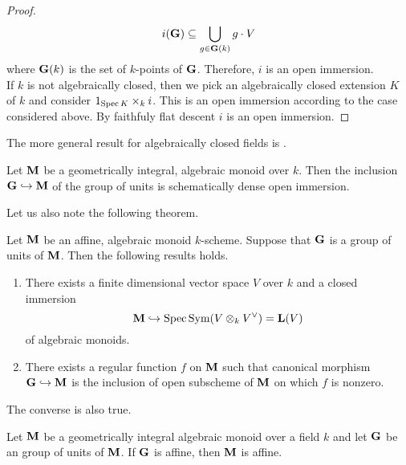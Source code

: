 \begin{proof}
$$i(\mathbf{G})\subseteq \bigcup_{g\in \mathbf{G}(k)}g\cdot V$$
where $\mathbf{G}(k)$ is the set of $k$-points of $\mathbf{G}$. Therefore, $i$ is an open immersion.\\
If $k$ is not algebraically closed, then we pick an algebraically closed extension $K$ of $k$ and consider $1_{\mathrm{Spec}\, K}\times_k i$. This is an open immersion according to the case considered above. By faithfuly flat descent $i$ is an open immersion. 
\end{proof}
\noindent
The more general result for algebraically closed fields is {\cite[Theorem 1]{brion2014algebraic}}.

\begin{corollary}\label{corollary:unit_group_is_schematically_dense_and_open_in_geometrically_integral_algebraic_monoids}
Let $\mathbf{M}$ be a geometrically integral, algebraic monoid over $k$. Then the inclusion $\mathbf{G}\hookrightarrow \mathbf{M}$ of the group of units is schematically dense open immersion.
\end{corollary}

Let us also note the following theorem.

\begin{theorem}\label{theorem:units_are_open_in_an_affine_algebraic_monoid_and_it_is_a_closed_submonoid_of_a_matrix_monoid}
Let $\mathbf{M}$ be an affine, algebraic monoid $k$-scheme. Suppose that $\mathbf{G}$ is a group of units of $\mathbf{M}$. Then the following results holds.
\begin{enumerate}[label=\emph{\textbf{(\arabic*)}}, leftmargin=3.0em]
\item There exists a finite dimensional vector space $V$ over $k$ and a closed immersion
$$\mathbf{M}\hookrightarrow \mathrm{Spec}\, \textrm{Sym}(V\otimes_kV^{\vee}) = \mathbf{L}(V)$$
of algebraic monoids.
\item There exists a regular function $f$ on $\mathbf{M}$ such that canonical morphism $\mathbf{G}\hookrightarrow \mathbf{M}$ is the inclusion of open subscheme of $\mathbf{M}$ on which $f$ is nonzero.
\end{enumerate}
\end{theorem}
\noindent
The converse is also true.

\begin{theorem}\label{theorem:units_are_affine_then_monoid_is_affine}
Let $\mathbf{M}$ be a geometrically integral algebraic monoid over a field $k$ and let $\mathbf{G}$ be an group of units of $\mathbf{M}$. If $\mathbf{G}$ is affine, then $\mathbf{M}$ is affine.
\end{theorem}


